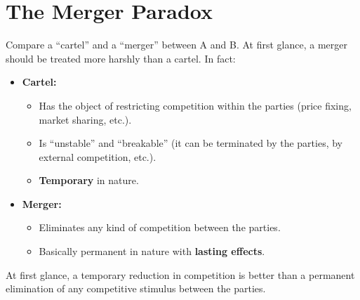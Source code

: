             


\section{The Merger Paradox}

    \noindent
    Compare a “cartel” and a “merger” between A and B. At first glance, a merger should be treated more harshly than a cartel. In fact:

        \begin{itemize}
            \item \textbf{Cartel:} 
            \begin{itemize}
                \item Has the object of restricting competition within the parties (price fixing, market sharing, etc.).
                \item Is “unstable” and “breakable” (it can be terminated by the parties, by external competition, etc.).
                \item \textbf{Temporary} in nature.
            \end{itemize}
            \item \textbf{Merger:}
            \begin{itemize}
                \item Eliminates any kind of competition between the parties.
                \item Basically permanent in nature with \textbf{lasting effects}.
            \end{itemize}
        \end{itemize}
        
        \noindent
        At first glance, a temporary reduction in competition is better than a permanent elimination of any competitive stimulus between the parties.
        
